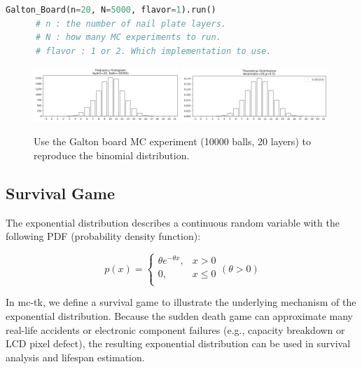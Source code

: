 \documentclass[11pt, letterpaper]{article}
\begin{document}
\lstset{
    basicstyle=\footnotesize,
    xleftmargin=-3em,aboveskip=0.5em,aboveskip=0.5em
}
\begin{lstlisting}[language=python]
      Galton_Board(n=20, N=5000, flavor=1).run()
      # n : the number of nail plate layers.
      # N : how many MC experiments to run.
      # flavor : 1 or 2. Which implementation to use.
      \end{lstlisting}

\begin{figure}[htbp]
    \centering
    \includegraphics[width=0.49\textwidth]{fig2-galton board mc1.png}
    \includegraphics[width=0.49\textwidth]{fig2-galton board mc2.png}
    \caption{Use the Galton board MC experiment (10000 balls, 20 layers) to reproduce the binomial distribution.}
    \label{fig:galton board mc}
\end{figure}

\subsection{Survival Game}
The exponential distribution describes a continuous random variable with the following PDF
(probability density function):

\begin{equation}
    \label{deqn_ex1}
    p(x)= \left\{\begin{array}{rcl}
        \theta e^{-\theta x}, & x > 0    \\
        0,                    & x \leq 0 \\
    \end{array}\right.
    (\theta > 0)
\end{equation}

In mc-tk, we define a survival game to illustrate the underlying mechanism of the exponential
distribution. Because the sudden death game can approximate many real-life accidents or
electronic component failures (e.g., capacity breakdown or LCD pixel defect), the resulting
exponential distribution can be used in survival analysis and lifespan estimation.
\end{document}
